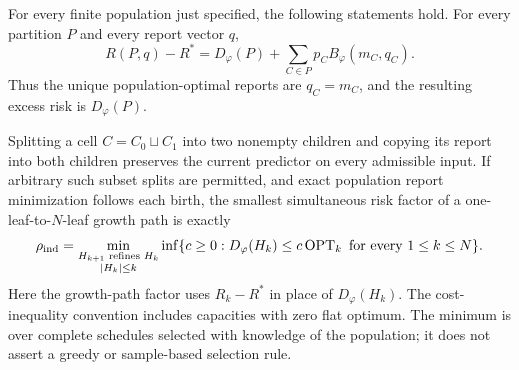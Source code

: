 \begin{theorem}
\label{thm:p9-bridge}
For every finite population just specified, the following statements hold.
For every partition $P$ and every report vector $q$,
\begin{equation}
 R(P,q)-R^*=D_\varphi(P)+
       \sum_{C\in P}p_CB_\varphi(m_C,q_C).
 \label{eq:p9-risk-decomposition}
\end{equation}
Thus the unique population-optimal reports are $q_C=m_C$, and the resulting
excess risk is $D_\varphi(P)$.

Splitting a cell $C=C_0\sqcup C_1$ into two nonempty children and copying
its report into both children preserves the current predictor on every
admissible input. If arbitrary such subset splits are permitted, and exact
population report minimization follows each birth, the smallest simultaneous
risk factor of a one-leaf-to-$N$-leaf growth path is exactly
\begin{equation}
 \rho_{\rm ind}
 =\min_{\substack{H_{k+1}\text{ refines }H_k\\|H_k|\le k}}
 \inf\{c\ge0:D_\varphi(H_k)\le c\operatorname{OPT}_k
                       \text{ for every }1\le k\le N\}.
 \label{eq:p9-price-equivalence}
\end{equation}
Here the growth-path factor uses $R_k-R^*$ in place of $D_\varphi(H_k)$.
The cost-inequality convention includes capacities with zero flat optimum.
The minimum is over complete schedules selected with knowledge of the
population; it does not assert a greedy or sample-based selection rule.
\end{theorem}
